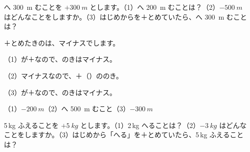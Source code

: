 
\begin{reidai}[\R{正}{せい}の\R{数}{かず}・\R{負}{ふ}の\R{数}{かず}で\R{表}{あらわ}す]
へ \qty{300}{m} むことを $+\qty{300}{m}$ とします。（1）へ \qty{200}{m} むことは？\quad（2）$\qty{-500}{m}$ はどんなことをしますか。\quad（3）はじめからを＋とめていたら、へ \qty{300}{m} むことは？\par
\kangaekata ＋とめたきのは、マイナスでします。\par
\shiki （1）が＋なので、のきはマイナス。\par
\hspace*{2.6\zw}（2）マイナスなので、＋（）ののき。\par
\hspace*{2.6\zw}（3）が＋なので、のきはマイナス。\par
\kotae （1）$\qty{-200}{m}$\quad（2）へ \qty{500}{m} むこと\quad（3）$\qty{-300}{m}$
\end{reidai}

\begin{jibun}
5\,kg ふえることを $+\qty{5}{kg}$ とします。（1）2\,kg へることは？\quad（2）$\qty{-3}{kg}$ はどんなことをしますか。\quad（3）はじめから「へる」を＋とめていたら、5\,kg ふえることは？
\end{jibun}

